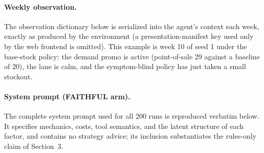 \documentclass{article}
\begin{document}
\paragraph{Weekly observation.} The observation dictionary below is
serialized into the agent's context each week, exactly as produced by the
environment (a presentation-manifest key used only by the web frontend is
omitted). This example is week 10 of seed 1 under the base-stock policy:
the demand promo is active (point-of-sale 29 against a baseline of 20), the
lane is calm, and the symptom-blind policy has just taken a small stockout.

{\footnotesize}

\paragraph{System prompt (FAITHFUL arm).} The complete system prompt used
for all 200 runs is reproduced verbatim below. It specifies mechanics,
costs, tool semantics, and the latent structure of each factor, and
contains no strategy advice; its inclusion substantiates the rules-only
claim of Section~3.

{\footnotesize}

% 
% 
\end{document}
